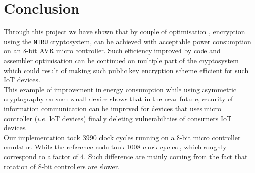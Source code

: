 \section{Conclusion}
\label{sec:conclusion}
Through this project we have shown that by couple of optimisation , encryption using the \texttt{NTRU} cryptosystem, can be achieved with acceptable power consumption on an 8-bit AVR micro controller. Such efficiency improved by code and assembler optimisation can be continued on multiple part of the cryptosystem which could result of making such public key encryption scheme  efficient for such IoT devices.\\
This example of improvement in energy consumption while using asymmetric cryptography on such small device shows that in the near future, security of information communication can be improved for devices that uses micro controller ($i.e.$ IoT devices) finally deleting vulnerabilities of consumers IoT devices.\\ 
	Our implementation took 3990 clock cycles running on a 8-bit micro controller emulator. While the reference code \cite{dai_optimizing_2018} took 1008 clock cycles , which roughly correspond to a factor of 4. Such difference are mainly coming from the fact that rotation of 8-bit controllers are slower.
